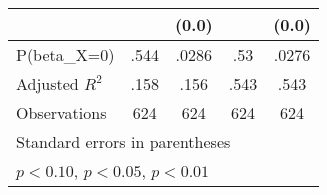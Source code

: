 \begin{table}[htbp]
\begin{tabular}{l*{4}{c}}
                &                  &    (0.0)         &                  &    (0.0)         \\
\hline
P(beta\_X=0)     &     .544         &    .0286         &      .53         &    .0276         \\
Adjusted \(R^{2}\)&     .158         &     .156         &     .543         &     .543         \\
Observations    &      624         &      624         &      624         &      624         \\
\hline\hline
\multicolumn{5}{l}{\footnotesize Standard errors in parentheses}\\
\multicolumn{5}{l}{\footnotesize \sym{*} \(p<0.10\), \sym{**} \(p<0.05\), \sym{***} \(p<0.01\)}\\
\end{tabular}
\end{table}
